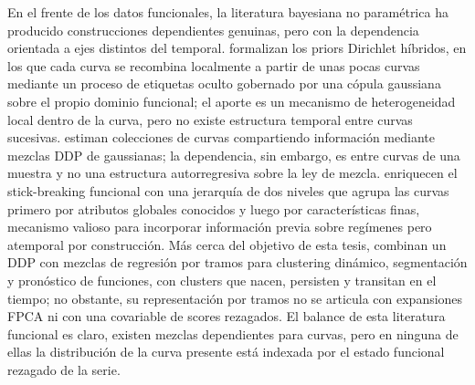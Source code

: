 En el frente de los datos funcionales, la literatura bayesiana no paramétrica ha producido construcciones dependientes genuinas, pero con la dependencia orientada a ejes distintos del temporal. \citet{03_01_petrone2009hybrid} formalizan los priors Dirichlet híbridos, en los que cada curva se recombina localmente a partir de unas pocas curvas mediante un proceso de etiquetas oculto gobernado por una cópula gaussiana sobre el propio dominio funcional; el aporte es un mecanismo de heterogeneidad local dentro de la curva, pero no existe estructura temporal entre curvas sucesivas. \citet{03_01_rodriguez2009functional} estiman colecciones de curvas compartiendo información mediante mezclas DDP de gaussianas; la dependencia, sin embargo, es entre curvas de una muestra y no una estructura autorregresiva sobre la ley de mezcla. \citet{03_01_scarpa2014enriched} enriquecen el stick-breaking funcional con una jerarquía de dos niveles que agrupa las curvas primero por atributos globales conocidos y luego por características finas, mecanismo valioso para incorporar información previa sobre regímenes pero atemporal por construcción. Más cerca del objetivo de esta tesis, \citet{03_01_gamasaee2017mining} combinan un DDP con mezclas de regresión por tramos para clustering dinámico, segmentación y pronóstico de funciones, con clusters que nacen, persisten y transitan en el tiempo; no obstante, su representación por tramos no se articula con expansiones FPCA ni con una covariable de scores rezagados. El balance de esta literatura funcional es claro, existen mezclas dependientes para curvas, pero en ninguna de ellas la distribución de la curva presente está indexada por el estado funcional rezagado de la serie.\\
 

